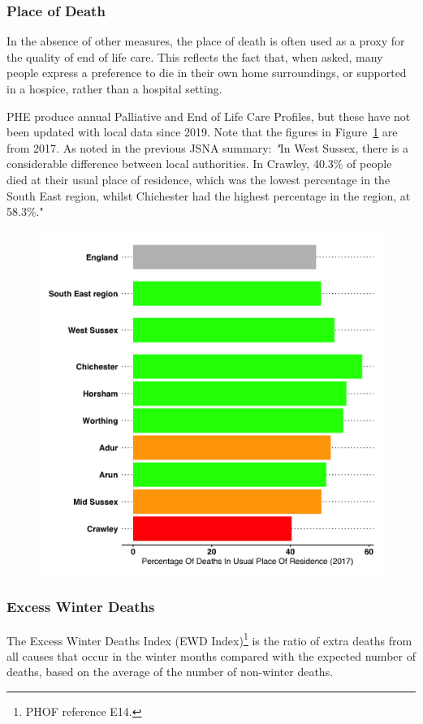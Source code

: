 \subsubsection{Place of Death}

 In the absence of other measures, the place of death is often used as a proxy for the quality of end of life care. This reflects the fact that, when asked, many people express a preference to die in their own home surroundings, or supported in a hospice, rather than a hospital setting.

 PHE produce annual Palliative and End of Life Care Profiles, but these have not been updated with local data since 2019. Note that the figures in Figure~\ref{fig:DiUPR} are from 2017. As noted in the previous  JSNA summary: {\textit "In West Sussex, there is a considerable difference between local authorities. In Crawley, 40.3\% of people died at their usual place of residence, which was the lowest percentage in the South East region, whilst Chichester had the highest percentage in the region, at 58.3\%."}

\begin{figure}
    \caption{}\label{fig:DiUPR}
    \centering
    \includegraphics[width=\linewidth]{images/diupr_rag_bar.png}
\end{figure}

\subsubsection{Excess Winter Deaths}
The Excess Winter Deaths Index (EWD Index)\footnote{PHOF reference E14.} is the ratio of extra deaths from all causes that occur in the winter months compared with the expected number of deaths, based on the average of the number of non-winter deaths. 

